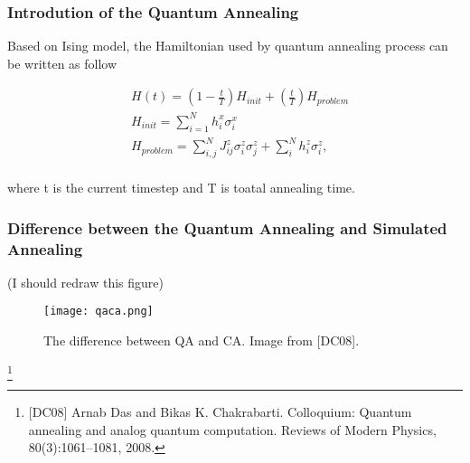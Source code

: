 \documentclass{beamer}
\begin{document}
\begin{frame}
	\frametitle{Introdution of the Quantum Annealing}
	Based on Ising model, the Hamiltonian used by quantum annealing process can be written as follow
	
	\begin{equation}
	\label{Hamiltonian_set}
	\begin{split}
	&H(t)=(1-\frac{t}{T} )H_{init}+(\frac{t}{T})H_{problem} \\
	&H_{init}= \sum_{i=1}^{N}h_i^x \sigma_i^x\\
	&H_{problem}= \sum_{i,j}^N J_{ij}^z \sigma^z_i \sigma^z_j + \sum_{i}^N h_i^z \sigma^z_i,\\
	\end{split}
	\end{equation} 
	
	where t is the current timestep and T is toatal annealing time.\\
	
	
	
\end{frame}




\begin{frame}
	\frametitle{Difference between the Quantum Annealing and Simulated Annealing}
	(I should redraw this figure)
	\begin{figure}[h]
		\centering
		\texttt{[image: qaca.png]}
		\caption{The difference between QA and CA. Image from [DC08]. }
		\label{diff_qa_ca}
	\end{figure}
	\footnote{[DC08] Arnab Das and Bikas K. Chakrabarti. Colloquium: Quantum annealing and analog quantum
		computation. Reviews of Modern Physics, 80(3):1061–1081, 2008.}
\end{frame}
\end{document}
